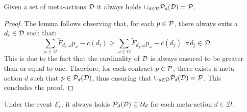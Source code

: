 \begin{lemma}\label{lem:union_pregions}
	Given a set of meta-actions $\mathcal{D}$ it always holds $\cup_{d\in \mathcal{D}} \mathcal{P}_d(\mathcal{D}) = \mathcal{P}$.
\end{lemma}
\begin{proof}
	

The lemma follows observing that, for each $p \in \mathcal{P}$, there always exits a $d_i \in \mathcal{D}$ such that:
\begin{equation*}
	\sum_{\omega \in \Omega}\widetilde{F}_{d_i,\omega}p_{\omega} - c({d_i}) \geq \sum_{\omega \in \Omega}\widetilde{F}_{d_j,\omega}p_{\omega} - c({d_j}) \,\,\, \forall d_j \in \mathcal{D}.
\end{equation*}
This is due to the fact that the cardinality of $\mathcal{D}$ is always ensured to be greater than or equal to one. Therefore, for each contract $p \in \mathcal{P}$, there exists a meta-action $d$ such that $p \in \mathcal{P}_d(\mathcal{D})$, thus ensuring that $\cup_{d\in \mathcal{D}} \mathcal{P}_d(\mathcal{D}) = \mathcal{P}$. This concludes the proof.
\end{proof}


%



\begin{lemma}\label{lem:inclusion_upperbounds}
	Under the event $\mathcal{E}_\epsilon$, it always holds $\mathcal{P}_{d}(\mathcal{D}) \subseteq \mathcal{U}_{d}$ for each meta-action $d \in \mathcal{D}$.
\end{lemma} 

